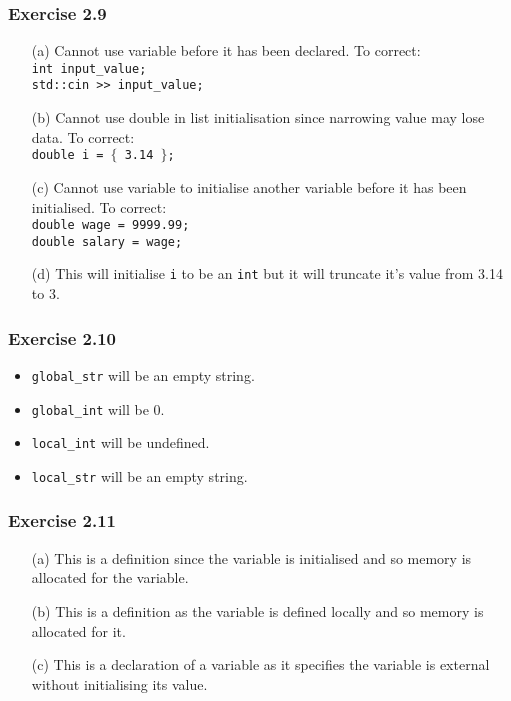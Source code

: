 \documentclass[12pt, a4paper]{article}
\begin{document}
\subsubsection*{Exercise 2.9}
\begin{itemize}
	\item [(a)]
		Cannot use variable before it has been declared. To correct:\\
		\texttt{int input\_value;}\\
		\texttt{std::cin >> input\_value;}
	\item [(b)]
		Cannot use double in list initialisation since narrowing value may lose data. To correct:\\
		\texttt{double i = $\{$ 3.14 $\}$;}
	\item [(c)]
		Cannot use variable to initialise another variable before it has been initialised. To correct:\\
		\texttt{double wage = 9999.99;}\\
		\texttt{double salary = wage;}
	\item [(d)]
		This will initialise \texttt{i} to be an \texttt{int} but it will truncate it's value from 3.14 to 3.
\end{itemize}

\subsubsection*{Exercise 2.10}
\begin{itemize}
	\item \texttt{global\_str} will be an empty string.
	\item \texttt{global\_int} will be 0.
	\item \texttt{local\_int} will be undefined.
	\item \texttt{local\_str} will be an empty string.
\end{itemize}

\subsubsection*{Exercise 2.11}
\begin{itemize}
	\item [(a)]
		This is a definition since the variable is initialised and so memory is allocated for the variable.
	\item [(b)]
		This is a definition as the variable is defined locally and so memory is allocated for it.
	\item [(c)]
		This is a declaration of a variable as it specifies the variable is external without initialising its value.
\end{itemize}
\end{document}
